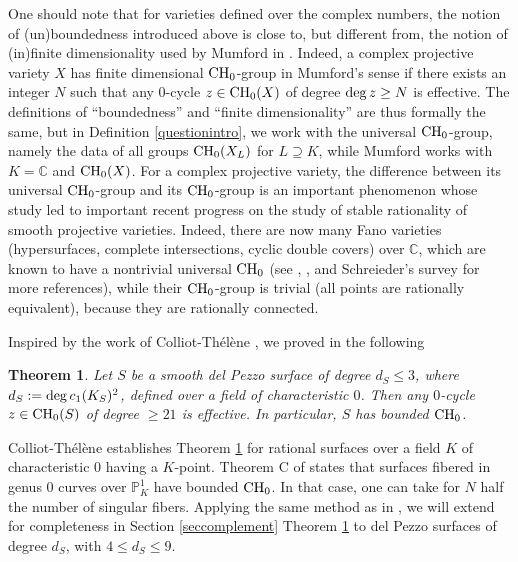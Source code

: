\documentclass[10pt]{article}
\newtheorem{theo}{Theorem}[section]
\begin{document}
One should note that for varieties defined over the complex numbers,  the notion of (un)boundedness introduced above is close to, but different from, the notion of (in)finite dimensionality   used  by Mumford in \cite{mumford}. Indeed,  a complex projective variety $X$ has finite dimensional ${\rm CH}_0$-group in Mumford's sense if there exists an integer $N$ such that any $0$-cycle $z\in {\rm CH}_0(X)$  of  degree  ${\rm deg}\,z\geq N$ is effective.  The definitions of ``boundedness'' and ``finite dimensionality'' are thus formally the same, but in Definition  \ref{questionintro},  we work with the universal ${\rm CH}_0$-group, namely the data of all groups ${\rm CH}_0(X_L)$ for $L\supseteq K$, while Mumford works with $K=\mathbb{C}$ and ${\rm CH}_0(X)$. For a complex projective variety, the difference between its  universal ${\rm CH}_0$-group and its ${\rm CH}_0$-group is an important  phenomenon whose study  led to   important recent progress on the study of stable rationality of smooth projective varieties. Indeed, there are now many  Fano varieties (hypersurfaces, complete intersections, cyclic double covers) over $\mathbb{C}$, which are known to have a nontrivial universal ${\rm CH}_0$ (see \cite{voisininvent}, \cite{CTPi}, \cite{totaro} and Schreieder's survey \cite{schreiedericm} for more references), while  their ${\rm CH}_0$-group is trivial (all points are rationally equivalent), because they are  rationally connected.



Inspired by the work of Colliot-Th\'{e}l\`{e}ne  \cite{colliot}, we  proved in \cite{voisindelpezzo} the following
\begin{theo} \label{theorappeldp}   Let $S$ be a smooth del Pezzo surface of degree $d_S\leq 3$, where $d_S:={\rm deg}\,c_1(K_S)^2$,  defined over a field of characteristic $0$. Then any $0$-cycle $z\in {\rm CH}_0(S)$ of degree  $\geq 21$  is effective. In particular, $S$ has   bounded  ${\rm CH}_0$.
\end{theo}
Colliot-Th\'{e}l\`{e}ne establishes Theorem \ref{theorappeldp} for rational  surfaces over  a field $K$ of  characteristic $0$ having  a $K$-point. Theorem C of  \cite{CTCoray}  states that  surfaces fibered in genus $0$ curves over $\mathbb{P}^1_K$ have bounded ${\rm CH}_0$. In that case, one can take for $N$ half the number of singular fibers.
Applying the same method as in \cite{voisindelpezzo}, we will extend  for completeness in   Section \ref{seccomplement}   Theorem  \ref{theorappeldp} to del Pezzo surfaces of degree $d_S$, with  $4\leq d_S\leq 9$.
\end{document}
